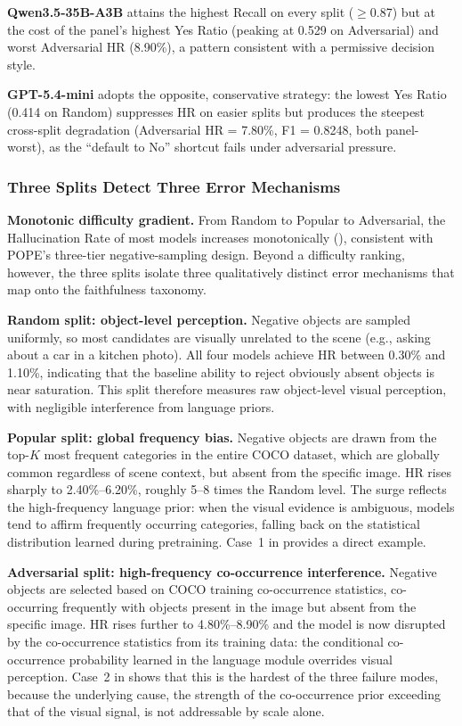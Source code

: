 \textbf{Qwen3.5-35B-A3B} attains the highest Recall on every split
($\geq$0.87)
but at the cost of the panel's highest Yes Ratio
(peaking at 0.529 on Adversarial)
and worst Adversarial HR (8.90\%),
a pattern consistent with a permissive decision style.

\textbf{GPT-5.4-mini} adopts the opposite, conservative strategy:
the lowest Yes Ratio (0.414 on Random)
suppresses HR on easier splits
but produces the steepest cross-split degradation
(Adversarial HR = 7.80\%, F1 = 0.8248, both panel-worst),
as the ``default to No'' shortcut fails
under adversarial pressure.

\subsubsection{Three Splits Detect Three Error Mechanisms}
\label{sec:pope_difficulty}

\textbf{Monotonic difficulty gradient.}
From Random to Popular to Adversarial,
the Hallucination Rate of most models increases monotonically
(),
consistent with POPE's three-tier negative-sampling design.
Beyond a difficulty ranking,
however, the three splits isolate
three qualitatively distinct error mechanisms
that map onto the faithfulness taxonomy.

\textbf{Random split: object-level perception.}
Negative objects are sampled uniformly,
so most candidates are visually unrelated to the scene
(e.g., asking about a car in a kitchen photo).
All four models achieve HR between 0.30\% and 1.10\%,
indicating that the baseline ability to reject obviously absent objects
is near saturation.
This split therefore measures raw object-level visual perception,
with negligible interference from language priors.

\textbf{Popular split: global frequency bias.}
Negative objects are drawn from the top-$K$ most frequent categories
in the entire COCO dataset,
which are globally common regardless of scene context,
but absent from the specific image.
HR rises sharply to 2.40\%--6.20\%,
roughly 5--8 times the Random level.
The surge reflects the high-frequency language prior:
when the visual evidence is ambiguous,
models tend to affirm frequently occurring categories,
falling back on the statistical distribution
learned during pretraining.
Case~1 in  provides a direct example.

\textbf{Adversarial split: high-frequency co-occurrence interference.}
Negative objects are selected based on COCO training co-occurrence statistics,
co-occurring frequently with objects present in the image
but absent from the specific image.
HR rises further to 4.80\%--8.90\%
and the model is now disrupted by the co-occurrence statistics
from its training data:
the conditional co-occurrence probability learned in the language module
overrides visual perception.
Case~2 in 
shows that this is the hardest of the three failure modes,
because the underlying cause, the strength of the co-occurrence prior
exceeding that of the visual signal, is
not addressable by scale alone.

